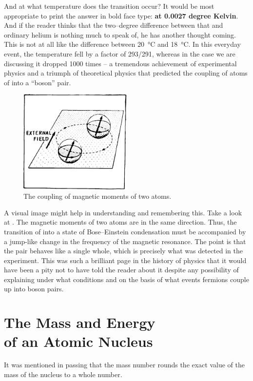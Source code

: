 And at what temperature does the transition occur? It would be most appropriate to print the answer in bold­ face type: \textbf{at 0.0027 degree Kelvin}. And if the reader thinks that the two--degree difference between that and ordinary  helium is nothing much to speak of, he has another thought coming. This is not at all like the difference between \SI{20}{\celsius} and \SI{18}{\celsius}. In this everyday event, the temperature fell by a factor of 293/291, whereas in the case we are discussing it dropped 1000 times -- a tremendous achievement of experimental physics and a triumph of theoretical physics that predicted the coupling of atoms of  into a ``boson'' pair.

\begin{figure}[!ht]
\centering
\includegraphics[width=0.5\textwidth]{figures/fig-05-05.pdf}
\caption{The coupling of magnetic moments of two atoms.}
\label{fig-5.5}
\end{figure}

A visual image might help in understanding and re­membering this. Take a look at . The magnetic moments of two atoms are in the same direction. Thus, the transition of  into a state of Bose--Einstein con­densation must be accompanied by a jump-like change in the frequency of the magnetic resonance. The point is that the pair behaves like a single whole, which is precisely what was detected in the experiment. This was such a brilliant page in the history of physics that it would have been a pity not to have told the reader about it despite any possibility of explaining under what con­ditions and on the basis of what events fermions couple up into boson pairs.

\section[The Mass and Energy of an Atomic Nucleus]{The Mass and Energy \\of an Atomic Nucleus}
It was mentioned in passing that the mass number rounds the exact value of the mass of the nucleus to a whole number.

